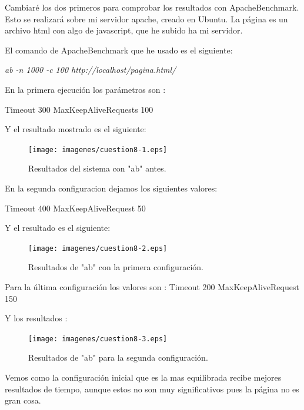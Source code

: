 Cambiaré los dos primeros para comprobar los resultados con ApacheBenchmark. Esto se realizará sobre mi servidor apache, creado en Ubuntu.
La página es un archivo html con algo de javascript, que he subido ha mi servidor.

El comando de ApacheBenchmark que he usado es el siguiente:

\textit{ab -n 1000 -c 100 http://localhost/pagina.html/}

En la primera ejecución los parámetros son :

Timeout 300
MaxKeepAliveRequests 100

Y el resultado mostrado  es el siguiente:

\begin{figure}[H]
\begin{center}
\texttt{[image: imagenes/cuestion8-1.eps]}
\caption{Resultados del sistema con "ab" antes.}
\end{center}
\end{figure}

En la segunda configuracion dejamos los siguientes valores:

Timeout 400
MaxKeepAliveRequest 50

Y el resultado es el siguiente:
\begin{figure}[H]
\begin{center}
\texttt{[image: imagenes/cuestion8-2.eps]}
\caption{Resultados de "ab" con la primera configuración.}
\end{center}
\end{figure}

Para la última configuración los valores son :
Timeout 200
MaxKeepAliveRequest 150

Y los resultados :

\begin{figure}[H]
\begin{center}
\texttt{[image: imagenes/cuestion8-3.eps]}
\caption{Resultados de "ab" para la segunda configuración.}
\end{center}
\end{figure}


Vemos como la configuración inicial que es la mas equilibrada recibe mejores resultados de tiempo, aunque estos no son muy significativos pues la página no es gran cosa.




